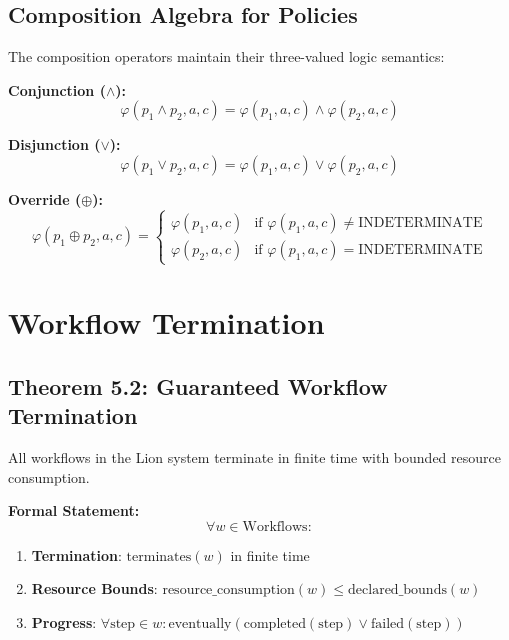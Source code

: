 \subsection{Composition Algebra for Policies}

The composition operators maintain their three-valued logic semantics:

\textbf{Conjunction ($\land$):}
$$\varphi(p_1 \land p_2, a, c) = \varphi(p_1, a, c) \land \varphi(p_2, a, c)$$

\textbf{Disjunction ($\lor$):}
$$\varphi(p_1 \lor p_2, a, c) = \varphi(p_1, a, c) \lor \varphi(p_2, a, c)$$

\textbf{Override ($\oplus$):}
$$\varphi(p_1 \oplus p_2, a, c) = \begin{cases}
\varphi(p_1, a, c) & \text{if } \varphi(p_1, a, c) \neq \text{INDETERMINATE} \\
\varphi(p_2, a, c) & \text{if } \varphi(p_1, a, c) = \text{INDETERMINATE}
\end{cases}$$

\newpage

\section{Workflow Termination}

\subsection{Theorem 5.2: Guaranteed Workflow Termination}

\begin{theorem}
\label{thm:ch5-workflow-termination}
All workflows in the Lion system terminate in finite time with bounded resource consumption.
\end{theorem}

\textbf{Formal Statement:}
$$\forall w \in \text{Workflows}:$$

\begin{enumerate}
\item \textbf{Termination}: $\text{terminates}(w)$ in finite time
\item \textbf{Resource Bounds}: $\text{resource\_consumption}(w) \leq \text{declared\_bounds}(w)$
\item \textbf{Progress}: $\forall \text{step} \in w: \text{eventually}(\text{completed}(\text{step}) \lor \text{failed}(\text{step}))$
\end{enumerate}

